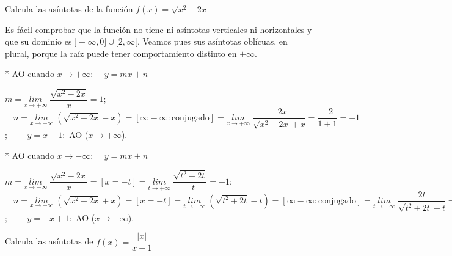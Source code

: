 	
	
	\begin{ejre} Calcula las asíntotas de la función $f(x)=\sqrt{
	x^2-2x}$
		
	\end{ejre}
	
	\begin{proofw}\renewcommand{\qedsymbol}{$\diamond$}
	
	Es fácil comprobar que la función no tiene ni asíntotas verticales ni horizontales y que su dominio es $]-\infty,0]\cup[2,\infty[$. Veamos pues sus asíntotas oblícuas, en plural, porque la raíz puede tener comportamiento distinto en $\pm \infty$.
	
	*  AO cuando $x\to +\infty$: $\quad y=mx+n$
	
	$m=\underset {x\to +\infty}{lim}\; {\dfrac {\sqrt{x^2-2x}}{x}}=1$; $\quad n=\underset {x\to +\infty}{lim}\; {(\sqrt{x^2-2x}-x)}=[\infty - \infty: \mbox{conjugado}]= \underset {x\to +\infty}{lim}\; {\dfrac {-2x}{\sqrt{x^2-2x}+x}}=\dfrac {-2}{1+1}=-1$; $\qquad y=x-1:$ AO ($x\to +\infty$).
	
	\vspace{3mm}* AO cuando $x\to -\infty$: $\quad y=mx+n$
	
	$m=\underset {x\to -\infty}{lim}\; {\dfrac {\sqrt{x^2-2x}}{x}}=[x=-t]=\underset {t\to +\infty}{lim}\; {\dfrac {\sqrt{t^2+2t}}{-t}}=-1$; $\quad n=\underset {x\to -\infty}{lim}\; {(\sqrt{x^2-2x}+x)}=
	[x=-t]=\underset {t\to +\infty}{lim}\; {(\sqrt{t^2+2t}-t)}=[\infty - \infty: \mbox{conjugado}]= \underset {t\to +\infty}{lim}\; {\dfrac {2t}{\sqrt{t^2+2t}+t}}=\dfrac {2}{1+1}=1$; $\qquad y=-x+1:$ AO ($x\to -\infty$).
	
	
		
	\end{proofw}
	
		
	\begin{ejre} Calcula las asíntotas de $f(x)=\dfrac {|x|}{x+1}$
		
	\end{ejre}
	
